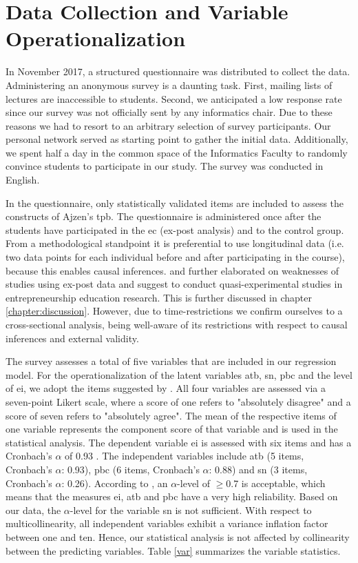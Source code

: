 \section{Data Collection and Variable Operationalization}
In November 2017, a structured questionnaire was distributed to collect the data. Administering an anonymous survey is a daunting task. First, mailing lists of lectures are inaccessible to students. Second, we anticipated a low response rate since our survey was not officially sent by any informatics chair. Due to these reasons we had to resort to an arbitrary selection of survey participants. Our personal network served as starting point to gather the initial data. Additionally, we spent half a day in the common space of the Informatics Faculty to randomly convince students to participate in our study. The survey was conducted in English.

In the questionnaire, only statistically validated items are included to assess the constructs of Ajzen's \acl{tpb}. The questionnaire is administered once after the students have participated in the \ac{ec} (ex-post analysis) and to the control group. From a methodological standpoint it is preferential to use longitudinal data (i.e. two data points for each individual before and after participating in the course), because this enables causal inferences. \citet{lorz2013entrepreneurship} and \citet{von2010effects} further elaborated on weaknesses of studies using ex-post data and suggest to conduct quasi-experimental studies in entrepreneurship education research. This is further discussed in chapter \ref{chapter:discussion}. However, due to time-restrictions we confirm ourselves to a cross-sectional analysis, being well-aware of its restrictions with respect to causal inferences and external validity. 

The survey assesses a total of five variables that are included in our regression model. For the operationalization of the latent variables \acf{atb}, \acf{sn}, \acf{pbc} and the level of \acf{ei}, we adopt the items suggested by \citet{linan2009development}. All four variables are assessed via a seven-point Likert scale, where a score of one refers to "absolutely disagree" and a score of seven refers to "absolutely agree". The mean of the respective items of one variable represents the component score of that variable and is used in the statistical analysis. The dependent variable \ac{ei} is assessed with six items and has a Cronbach's $\alpha$ of 0.93 \citep{cortina1993coefficient}. The independent variables include \ac{atb} (5 items, Cronbach's $\alpha$: 0.93), \ac{pbc} (6 items, Cronbach's $\alpha$: 0.88) and \ac{sn} (3 items, Cronbach's $\alpha$: 0.26). According to \citet{hair2010black}, an $\alpha$-level of $\geq$0.7 is acceptable, which means that the measures \ac{ei}, \ac{atb} and \ac{pbc} have a very high reliability. Based on our data, the $\alpha$-level for the variable \ac{sn} is not sufficient. With respect to multicollinearity, all independent variables exhibit a variance inflation factor between one and ten. Hence, our statistical analysis is not affected by collinearity between the predicting variables. Table \ref{var} summarizes the variable statistics. 

